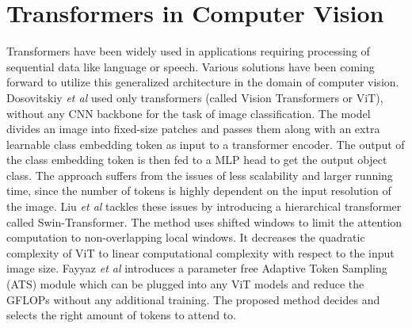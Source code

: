 \section{Transformers in Computer Vision}
\par Transformers \cite{tfm} have been widely used in applications requiring processing of sequential data like language or speech. Various solutions have been coming forward to utilize this generalized architecture in the domain of computer vision. Dosovitskiy \textit{et al} \cite{dosovitskiy2020vit} used only transformers (called Vision Transformers or ViT), without any CNN backbone for the task of image classification. The model divides an image into fixed-size patches and passes them along with an extra learnable class embedding token as input to a transformer encoder. The output of the class embedding token is then fed to a MLP head to get the output object class. The approach suffers from the issues of less scalability and larger running time, since the number of tokens is highly dependent on the input resolution of the image. Liu \textit{et al} \cite{liu2021swin} tackles these issues by introducing a hierarchical transformer called Swin-Transformer. The method uses shifted windows to limit the attention computation to non-overlapping local windows. It decreases the quadratic complexity of ViT to linear computational complexity with respect to the input image size. Fayyaz \textit{et al} \cite{fayyaz2021ats} introduces a parameter free Adaptive Token Sampling (ATS) module which can be plugged into any ViT models and reduce the GFLOPs without any additional training. The proposed method decides and selects the right amount of tokens to attend to. 
